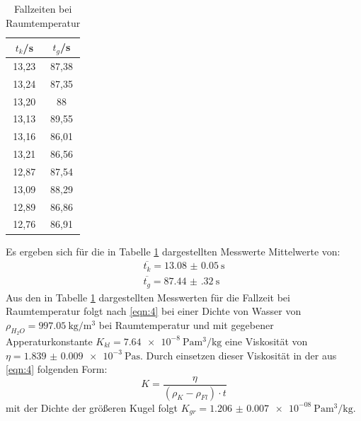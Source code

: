 \begin{table}[h]
  \centering
  \caption{Fallzeiten bei Raumtemperatur}
  \label{tab:3}
  \begin{tabular}{c c}
    \toprule
    $t_{k}$/\si{\second} & $t_{g}$/\si{\second} \\
    \midrule
    13,23 & 87,38 \\
    13,24 & 87,35 \\
    13,20 & 88\\
    13,13 & 89,55 \\
    13,16 & 86,01 \\
    13,21 & 86,56 \\
    12,87 & 87,54 \\
    13,09 & 88,29 \\
    12,89 & 86,86 \\
    12,76 & 86,91 \\
    \bottomrule
  \end{tabular}
\end{table}
Es ergeben sich für die in Tabelle \ref{tab:3} dargestellten Messwerte Mittelwerte von:
\begin{equation*}
  \begin{split}
    \overline{t_{k}} = \SI{13.08(5)}{\second}\\
    \overline{t_{g}} = \SI{87.44(32)}{\second}
  \end{split}
\end{equation*}
Aus den in Tabelle \ref{tab:3} dargestellten Messwerten für die Fallzeit bei Raumtemperatur
folgt nach \eqref{eqn:4} bei einer Dichte von Wasser von $\rho_{H_2O} = \SI[per-mode=reciprocal]{997.05}{\kilo\gram\per\cubic\metre}$ \cite[1]{LitEta} bei Raumtemperatur
und mit gegebener Apperaturkonstante $K_{kl} = \SI[per-mode=reciprocal]{7.64e-8}{\pascal\cubic\metre\per\kilo\gram}$ \cite[3]{anleitung}
eine Viskosität von $\eta = \SI{1.839(9)e-3}{\pascal\second}$.
Durch einsetzen dieser Viskosität in der aus \eqref{eqn:4} folgenden Form:
\begin{equation}
  K = \frac{\eta}{(\rho_K - \rho_{Fl}) \cdot t}
\end{equation}
mit der Dichte der größeren Kugel folgt $K_{gr} = \SI[per-mode=reciprocal]{1.206(7)e-08}{\pascal\cubic\metre\per\kilo\gram}$.
